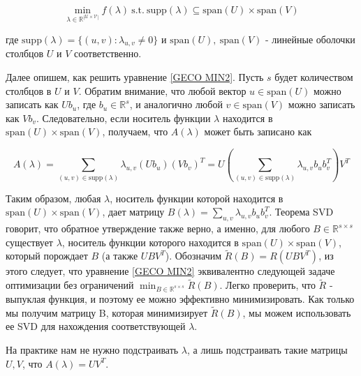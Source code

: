 \documentclass[oneside,final,14pt]{extreport} %
\begin{document}
\begin{equation}
	\label{GECO MIN2}
  \min_{\lambda \in \mathbb R^{|\mathcal{U} \times \mathcal{V}|}} f(\lambda)  \ \text{s.t.} \ \text{supp}(\lambda) \subseteq \text{span}(U) \times \text{span}(V)
\end{equation}

где $ \text{supp} (\lambda) = \{(u, v): \lambda_{u, v} \ne 0 \} $ и $ \text {span} (U), \ \text {span} (V) $ - линейные оболочки столбцов  $ U $ и $ V $ соответственно. 

Далее опишем, как решить уравнение \ref{GECO MIN2}. Пусть $ s $ будет количеством столбцов в $ U $ и $ V $. Обратим внимание, что любой вектор $ u \in \text {span} (U) $ можно записать как $ Ub_u $, где $ b_u \in \mathbb R^s $, и аналогично любой $ v \in \text {span} (V) $ можно записать как $ Vb_v $. Следовательно, если носитель функции $ \lambda $ находится в $ \text {span} (U) \times \text {span} (V) $, получаем, что $ A (\lambda) $ может быть записано как

\begin{equation}
  A(\lambda) = \sum_{(u,v) \in \text{supp}(\lambda)} \lambda_{u,v}(Ub_u)(Vb_v)^T = U \left( \sum_{(u,v) \in \text{supp}(\lambda)} \lambda _{u,v}b_ub_v^T\right )V^T
\end{equation}

Таким образом, любая $ \lambda $, носитель функции которой находится в $ \text {span} (U) \times \text {span} (V) $, дает матрицу $ B (\lambda) = \sum_ {u, v} \lambda _ {u, v} b_ub_v^T $. Теорема SVD говорит, что обратное утверждение также верно, а именно, для любого $ B \in \mathbb R^{s \times s} $ существует $ \lambda $, носитель функции которого находится в $ \text {span} (U ) \times \text {span} (V) $, который порождает $ B $ (а также $ UBV^T $). Обозначим $ \tilde R (B) = R (UBV^T) $, из этого следует, что уравнение \ref{GECO MIN2} эквивалентно следующей задаче оптимизации без ограничений $ \min_{B \in \mathbb R^{s \times s}} \tilde R (B) $. Легко проверить, что $ \tilde R $ - выпуклая функция, и поэтому ее можно эффективно минимизировать. Как только мы получим матрицу B, которая минимизирует $ \tilde R (B) $, мы можем использовать ее SVD для нахождения соответствующей $ \lambda $.

На практике нам не нужно подстраивать $ \lambda $, а лишь подстраивать такие матрицы $ U, V $, что $ A (\lambda) = U V^T $.
\end{document}
